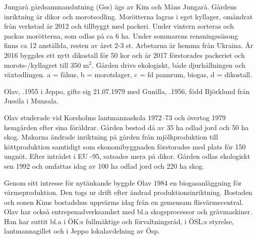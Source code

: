 %


%
Jungarå gårdsammanslutning (Gss) ägs av Kim och Måns Jungarå. Gårdens inriktning är dikor och morotsodling. Morötterna lagras i eget kyllager, omändrat från verkstad år 2012 och tillbyggt med packeri. Under vintern sorteras och packas morötterna, som odlas på ca 6 ha. Under sommarens rensningssäsong finns ca 12 anställda, resten av året 2-3 st. Arbetarna är hemma från Ukraina. År 2016 byggdes ett nytt dikostall för 50 kor och år 2017 förstorades packeriet och morots-/kyllagret till 350 m$^2$. Gården drivs ekologiskt, både djurhållningen och växtodlingen. a = fähus, b = morotslager, c = fd pannrum, biogas,  d = dikostall.



%
Olav, .1955 i Jeppo, gifte sig 21.07.1979 med Gunilla, .1956, född Björklund från Jussila i Munsala.
\begin{jhchildren}
  \item {}
  \item {}
  \item {}
\end{jhchildren}
Olav studerade vid Korsholms lantmannaskola 1972--73 och övertog 1979 hemgården efter sina föräldrar. Gården bestod då av 35 ha odlad jord och 50 ha skog. Makarna ändrade inriktning på gården från mjölkproduktion till köttproduktion samtidigt som ekonomibyggnaden förstorades med plats för 150 ungnöt. Efter inträdet i EU -95, satsades mera på dikor. Gården odlas ekologiskt sen 1992 och omfattas idag av 100 ha odlad jord och 220 ha skog.

Genom sitt intresse för nytänkande byggde Olav 1984 en biogasanläggning för värmeproduktion. Den togs ur drift efter ändrad produktionsinriktning. Bostaden och sonen Kims bostadshus uppvärms idag från en gemensam flisvärmecentral. Olav har också entrepenadverksamhet med bl.a skogsprocessor och grävmaskiner. Han har suttit bl.a i ÖK:s fullmäktige och förvaltningsråd, i ÖSL:s styrelse, lantmannagillet och i Jeppo lokalavdelning av Ösp.

